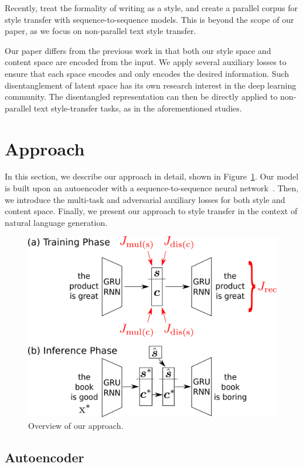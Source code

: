 \documentclass[letterpaper]{article} %
\newcommand{\citeay}[1]{\citeauthor{#1} \shortcite{#1}}
\begin{document}
Recently, \citeay{rao2018dear} treat the formality of writing as a style, and create a parallel corpus for style transfer with sequence-to-sequence models. This is beyond the scope of our paper, as we focus on non-parallel text style transfer.

Our paper differs from the previous work in that both our style space and content space are encoded from the input. We apply several auxiliary losses to ensure that each space encodes and only encodes the desired information. Such disentanglement of latent space has its own research interest in the deep learning community.
The disentangled representation can then be directly applied to non-parallel text style-transfer tasks, as in the aforementioned studies.


\section{Approach}

In this section, we describe our approach in detail, shown in Figure~\ref{fig:overview}.
Our model is built upon an autoencoder with a sequence-to-sequence neural network~\cite{sutskever2014sequence}.
Then, we introduce the multi-task and adversarial auxiliary losses for both style and content space.
Finally, we present our approach to style transfer in the context of natural language generation.

\begin{figure}[!t]
	\centering
	\includegraphics[width=.9\linewidth]{model-overview}
	\caption{Overview of our approach.}
	\label{fig:overview}
\end{figure}

\subsection{Autoencoder} \label{ssec:seq2seq-autoencoder}
\end{document}

